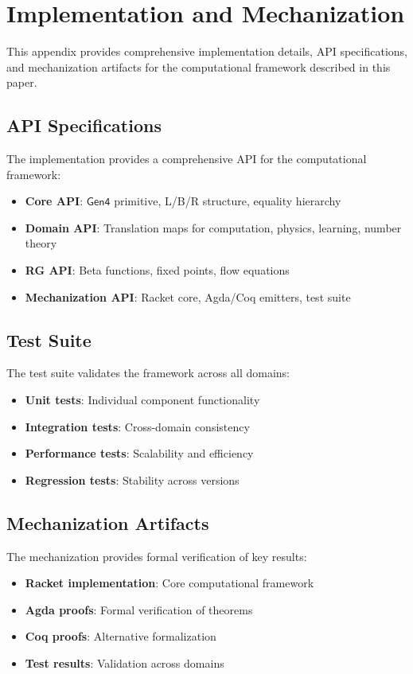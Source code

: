 \appendix
\section{Implementation and Mechanization}
\label{app:implementation}

This appendix provides comprehensive implementation details, API specifications, and mechanization artifacts for the computational framework described in this paper.

\subsection{API Specifications}

The implementation provides a comprehensive API for the computational framework:

\begin{itemize}
\item \textbf{Core API}: $\mathsf{Gen4}$ primitive, L/B/R structure, equality hierarchy
\item \textbf{Domain API}: Translation maps for computation, physics, learning, number theory
\item \textbf{RG API}: Beta functions, fixed points, flow equations
\item \textbf{Mechanization API}: Racket core, Agda/Coq emitters, test suite
\end{itemize}

\subsection{Test Suite}

The test suite validates the framework across all domains:
\begin{itemize}
\item \textbf{Unit tests}: Individual component functionality
\item \textbf{Integration tests}: Cross-domain consistency
\item \textbf{Performance tests}: Scalability and efficiency
\item \textbf{Regression tests}: Stability across versions
\end{itemize}

\subsection{Mechanization Artifacts}

The mechanization provides formal verification of key results:
\begin{itemize}
\item \textbf{Racket implementation}: Core computational framework
\item \textbf{Agda proofs}: Formal verification of theorems
\item \textbf{Coq proofs}: Alternative formalization
\item \textbf{Test results}: Validation across domains
\end{itemize}

